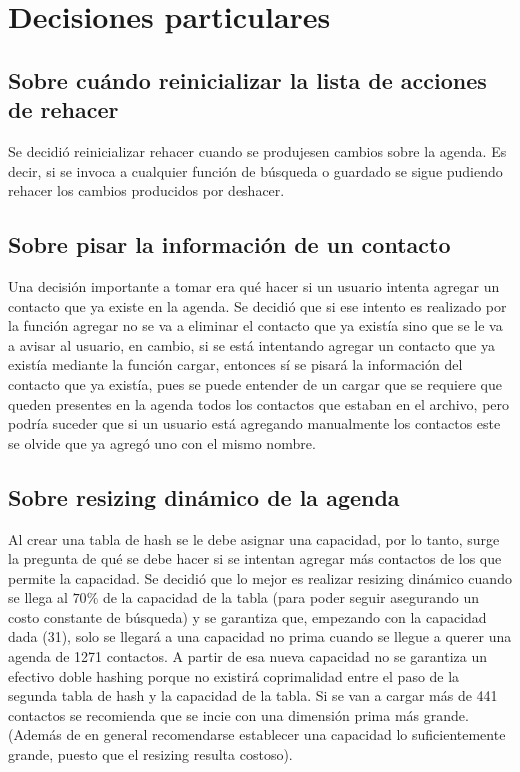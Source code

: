\documentclass[11pt]{article}
\begin{document}
\section{Decisiones particulares}

    \subsection{Sobre cu\'ando reinicializar la lista de acciones de rehacer}
    Se decidi\'o reinicializar rehacer cuando se produjesen cambios sobre la agenda. Es decir, si se invoca a cualquier funci\'on de b\'usqueda o guardado se sigue pudiendo rehacer los cambios producidos por deshacer.

    \subsection{Sobre pisar la informaci\'on de un contacto}
    Una decisi\'on importante a tomar era qu\'e hacer si un usuario intenta agregar un contacto que ya existe en la agenda. Se decidi\'o que si ese intento es realizado por la funci\'on agregar no se va a eliminar el contacto que ya exist\'ia sino que se le va a avisar al usuario, en cambio, si se est\'a intentando agregar un contacto que ya exist\'ia mediante la funci\'on cargar, entonces s\'i se pisar\'a la informaci\'on del contacto que ya exist\'ia,
    pues se puede entender de un cargar que se requiere que queden presentes en la agenda todos los contactos que estaban en el archivo, pero podr\'ia suceder que si un usuario est\'a agregando manualmente los contactos este se olvide que ya agreg\'o uno con el mismo nombre.

    \subsection{Sobre resizing din\'amico de la agenda}
    Al crear una tabla de hash se le debe asignar una capacidad, por lo tanto, surge la pregunta de qu\'e se debe hacer si se intentan agregar m\'as contactos de los que permite la capacidad. Se decidi\'o que lo mejor 
    es realizar resizing din\'amico cuando se llega al $70\%$ de la capacidad de la tabla (para poder seguir asegurando un costo constante de b\'usqueda) y se garantiza que, empezando con la capacidad dada (31), solo se llegar\'a a una capacidad no prima cuando se llegue a querer una agenda de 1271 contactos. A partir de esa nueva capacidad no se garantiza un efectivo doble hashing porque no existir\'a coprimalidad entre el paso de la segunda tabla de hash y la capacidad de la tabla. Si se van a cargar m\'as de 441 contactos se recomienda que se incie con una dimensi\'on prima m\'as grande. (Adem\'as de en general recomendarse establecer una capacidad lo suficientemente grande, puesto que el resizing resulta costoso).
\end{document}
